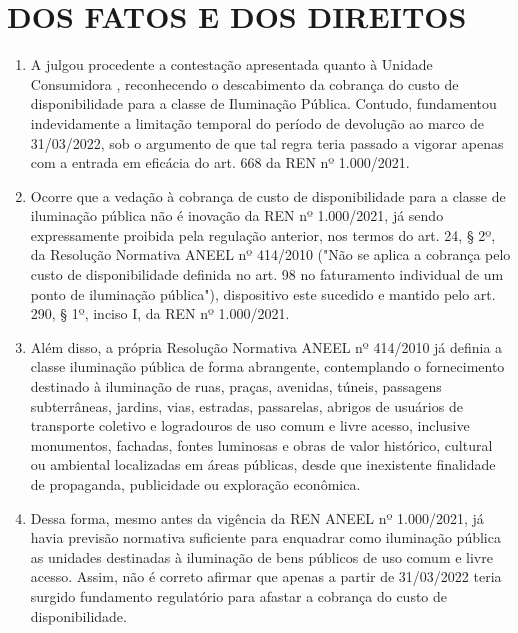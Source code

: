 \newcommand{\tipoRequerimento}{Contestação do Indeferimento de Reclassificação Tarifária para Iluminação Pública}

\section{DOS FATOS E DOS DIREITOS}

\begin{enumerate}[resume]
    \item A \nomeConcessionaria{} julgou procedente a contestação apresentada quanto à Unidade Consumidora \unidadeConsumidora{}, reconhecendo o descabimento da cobrança do custo de disponibilidade para a classe de Iluminação Pública. Contudo, fundamentou indevidamente a limitação temporal do período de devolução ao marco de 31/03/2022, sob o argumento de que tal regra teria passado a vigorar apenas com a entrada em eficácia do art. 668 da REN nº 1.000/2021.
    

    \item Ocorre que a vedação à cobrança de custo de disponibilidade para a classe de iluminação pública não é inovação da REN nº 1.000/2021, já sendo expressamente proibida pela regulação anterior, nos termos do art. 24, § 2º, da Resolução Normativa ANEEL nº 414/2010 ("Não se aplica a cobrança pelo custo de disponibilidade definida no art. 98 no faturamento individual de um ponto de iluminação pública"), dispositivo este sucedido e mantido pelo art. 290, § 1º, inciso I, da REN nº 1.000/2021.

    \item Além disso, a própria Resolução Normativa ANEEL nº 414/2010 já definia a classe iluminação pública de forma abrangente, contemplando o fornecimento destinado à iluminação de ruas, praças, avenidas, túneis, passagens subterrâneas, jardins, vias, estradas, passarelas, abrigos de usuários de transporte coletivo e logradouros de uso comum e livre acesso, inclusive monumentos, fachadas, fontes luminosas e obras de valor histórico, cultural ou ambiental localizadas em áreas públicas, desde que inexistente finalidade de propaganda, publicidade ou exploração econômica.

    \item Dessa forma, mesmo antes da vigência da REN ANEEL nº 1.000/2021, já havia previsão normativa suficiente para enquadrar como iluminação pública as unidades destinadas à iluminação de bens públicos de uso comum e livre acesso. Assim, não é correto afirmar que apenas a partir de 31/03/2022 teria surgido fundamento regulatório para afastar a cobrança do custo de disponibilidade.


\end{enumerate}
